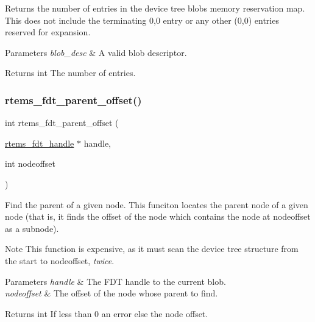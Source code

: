 Returns the number of entries in the device tree blob\textquotesingle{}s memory reservation map. This does not include the terminating 0,0 entry or any other (0,0) entries reserved for expansion.


\begin{DoxyParams}{Parameters}
{\em blob\+\_\+desc} & A valid blob descriptor. \\
\hline
\end{DoxyParams}
\begin{DoxyReturn}{Returns}
int The number of entries. 
\end{DoxyReturn}
\mbox{\label{rtems-fdt_8h_a99132e68dc89a9345760db5f986e26be}} 
\subsubsection{\texorpdfstring{rtems\_fdt\_parent\_offset()}{rtems\_fdt\_parent\_offset()}}
{\footnotesize\ttfamily int rtems\+\_\+fdt\+\_\+parent\+\_\+offset (\begin{DoxyParamCaption}\item[{\mbox{\hyperlink{structrtems__fdt__handle}{rtems\+\_\+fdt\+\_\+handle}} $\ast$}]{handle,  }\item[{int}]{nodeoffset }\end{DoxyParamCaption})}

Find the parent of a given node. This funciton locates the parent node of a given node (that is, it finds the offset of the node which contains the node at nodeoffset as a subnode).

\begin{DoxyNote}{Note}
This function is expensive, as it must scan the device tree structure from the start to nodeoffset, {\itshape twice}.
\end{DoxyNote}

\begin{DoxyParams}{Parameters}
{\em handle} & The F\+DT handle to the current blob. \\
\hline
{\em nodeoffset} & The offset of the node whose parent to find. \\
\hline
\end{DoxyParams}
\begin{DoxyReturn}{Returns}
int If less than 0 an error else the node offset. 
\end{DoxyReturn}
\mbox{\label{rtems-fdt_8h_a57007eed312123059461eb8bbace1c09}} 
